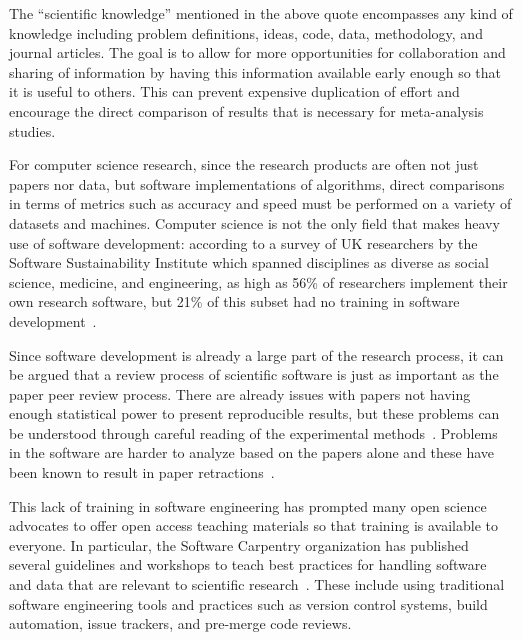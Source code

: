The ``scientific knowledge'' mentioned in the above quote
encompasses any kind of knowledge including problem definitions,
ideas, code, data, methodology, and journal articles. The goal is
to allow for more opportunities for collaboration and sharing of
information by having this information available early enough so
that it is useful to others. This can prevent expensive
duplication of effort and encourage the direct comparison of
results that is necessary for meta-analysis studies.

For computer science research, since the research
products are often not just papers nor data, but software
implementations of algorithms, direct comparisons in terms of
metrics such as accuracy and speed must be performed on a variety of
datasets and machines. Computer science is not the only field that
makes heavy use of software development:
according to a survey of UK researchers by the Software
Sustainability Institute which spanned disciplines as diverse as
social science, medicine, and engineering, as high as 56\% of
researchers implement their own research software, but 21\% of
this subset had no training in software
development~\autocite{SSI:hettrick_2014_14809}.

Since software development is already a large part of the research
process, it can be argued that a review process of scientific
software is just as important as the paper peer review process.
There are already issues with papers not having enough statistical power
to present reproducible results, but these problems can be
understood through careful reading of the experimental
methods~\autocite{Ioannidis2005,Button2013}. Problems in the software
are harder to analyze based on the papers alone and these have
been known to result in paper retractions~\autocite{Miller2006,Merali2010,Joppa2013}.

This lack of training in software engineering has prompted many
open science advocates to offer open access teaching
materials so that training is available to everyone.
In particular, the Software Carpentry organization has
published several guidelines and workshops to teach best
practices for handling software and data that are relevant to
scientific research~\autocite{Wilson2006,Wilson2014}. These
include using traditional software engineering tools and practices
such as version control systems, build automation, issue
trackers, and pre-merge code reviews.

